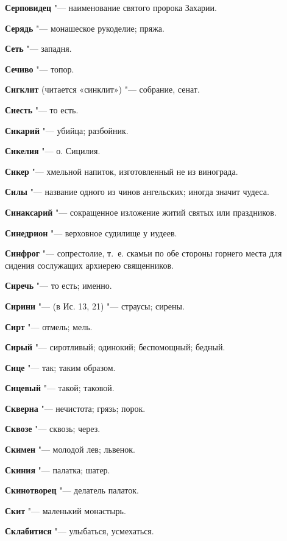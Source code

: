 \begin{mymulticols}
\noindent\textbf{Серповидец} "--- наименование святого пророка Захарии. 

\noindent\textbf{Серядь} "--- монашеское рукоделие; пряжа. 

\noindent\textbf{Сеть} "--- западня. 

\noindent\textbf{Сечиво} "--- топор. 

\noindent\textbf{Сигклит} (читается «синклит») "--- собрание, сенат. 

\noindent\textbf{Сиесть} "--- то есть. 

\noindent\textbf{Сикарий} "--- убийца; разбойник. 

\noindent\textbf{Сикелия} "--- о. Сицилия. 

\noindent\textbf{Сикер} "--- хмельной напиток, изготовленный не из винограда. 

\noindent\textbf{Силы} "--- название одного из чинов ангельских; иногда значит чудеса. 

\noindent\textbf{Синаксарий} "--- сокращенное изложение житий святых или праздников. 

\noindent\textbf{Синедрион} "--- верховное судилище у иудеев. 

\noindent\textbf{Синфрог} "--- сопрестолие, т.~е. скамьи по обе стороны горнего места для сидения сослужащих архиерею священников. 

\noindent\textbf{Сиречь} "--- то есть; именно. 

\noindent\textbf{Сирини} "--- (в Ис. 13, 21) "--- страусы; сирены. 

\noindent\textbf{Сирт} "--- отмель; мель. 

\noindent\textbf{Сирый} "--- сиротливый; одинокий; беспомощный; бедный. 

\noindent\textbf{Сице} "--- так; таким образом. 

\noindent\textbf{Сицевый} "--- такой; таковой. 

\noindent\textbf{Скверна} "--- нечистота; грязь; порок. 

\noindent\textbf{Сквозе} "--- сквозь; через. 

\noindent\textbf{Скимен} "--- молодой лев; львенок. 

\noindent\textbf{Скиния} "--- палатка; шатер. 

\noindent\textbf{Скинотворец} "--- делатель палаток. 

\noindent\textbf{Скит} "--- маленький монастырь. 

\noindent\textbf{Склабитися} "--- улыбаться, усмехаться. 


\end{mymulticols}
